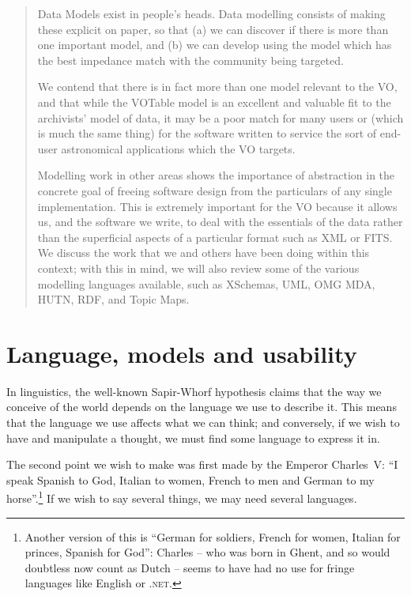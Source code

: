 \documentclass[11pt,twoside]{article}
\begin{document}
\begin{abstract}
Data Models exist in people's heads.  Data modelling consists of making
these explicit on paper, so that (a) we can discover if there is more
than one important model, and (b) we can develop using the model which
has the best impedance match with the community being targeted.

We contend that there is in fact more than one model relevant to the
VO, and that while the VOTable model is an excellent and valuable fit
to the archivists' model of data, it may be a poor match for many
users or (which is much the same thing) for the software written to
service the sort of end-user astronomical applications which the VO
targets.

Modelling work in other areas shows the importance of abstraction in
the concrete goal of freeing software design from the particulars of
any single implementation. This is extremely important for the VO
because it allows us, and the software we write, to deal with the
essentials of the data rather than the superficial aspects of a
particular format such as XML or FITS. We discuss the work that we and
others have been doing within this context; with this in mind, we will
also review some of the various modelling languages available, such as
XSchemas, UML, OMG MDA, HUTN, RDF, and Topic Maps.
\end{abstract}



\section{Language, models and usability}

In linguistics, the well-known Sapir-Whorf hypothesis claims that the
way we conceive of the world depends on the language we use to
describe it.  This means that the language we use affects what we can
think; and conversely, if we wish to have and manipulate a thought, we
must find some language to express it in.

The second point we wish to make was first made by the Emperor
Charles~V: ``I speak Spanish to God, Italian to women, French to men
and German to my horse''.\footnote{Another version of this is ``German
for soldiers, French for women, Italian for princes, Spanish for
God'': Charles -- who was born in Ghent, and so would doubtless now
count as Dutch -- seems to have had no use for fringe languages like
English or \textsc{.net}.}  If we wish to say several things, we may
need several languages.
\end{document}
